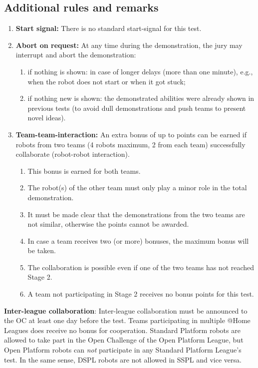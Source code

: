 \subsection{Additional rules and remarks}
\begin{enumerate}
	\item \textbf{Start signal:} There is no standard start-signal for this test.
	\item \textbf{Abort on request:} At any time during the demonstration, the jury may interrupt and abort the demonstration:
	\begin{enumerate}
		\item if nothing is shown: in case of longer delays (more than one minute), e.g., when the robot does not start or when it got stuck;
		\item if nothing new is shown: the demonstrated abilities were already shown in previous tests (to avoid dull demonstrations and push teams to present novel ideas).
	\end{enumerate}

	\item \textbf{Team-team-interaction:}  An extra bonus of up to \bonusRobotCoop points can be earned if robots from two teams (4 robots maximum, 2 from each team) successfully collaborate (robot-robot interaction).
	\begin{enumerate}
		\item This bonus is earned for both teams.
		\item The robot(s) of the other team must only play a minor role in the total demonstration.
		\item It must be made clear that the demonstrations from the two teams are not similar, otherwise the points cannot be awarded.
		\item In case a team receives two (or more) bonuses, the maximum bonus will be taken.
		\item The collaboration is possible even if one of the two teams has not reached Stage 2.
		\item A team not participating in Stage 2 receives no bonus points for this test.
	\end{enumerate}
\end{enumerate}

\textbf{Inter-league collaboration}: Inter-league collaboration must be announced to the OC at least one day before the test. Teams participating in multiple @Home Leagues does receive no bonus for cooperation. Standard Platform robots are allowed to take part in the Open Challenge of the Open Platform League, but Open Platform robots can \emph{not} participate in any Standard Platform League's test. In the same sense, DSPL robots are not allowed in SSPL and vice versa.


